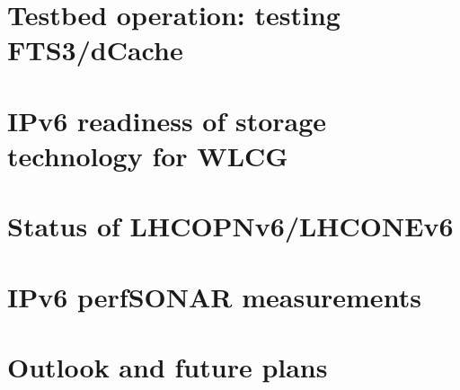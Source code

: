 \documentclass[a4paper]{jpconf}
\begin{document}
\section{Testbed operation: testing FTS3/dCache}


\section{IPv6 readiness of storage technology for WLCG}


\section{Status of LHCOPNv6/LHCONEv6}


\section{IPv6 perfSONAR measurements}


\section{Outlook and future plans}



\par

\end{document}
